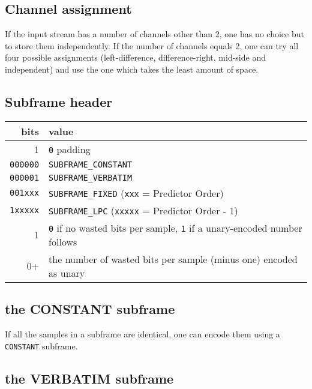 
\subsection{Channel assignment}

If the input stream has a number of channels other than 2,
one has no choice but to store them independently.
If the number of channels equals 2, one can try all four possible
assignments (left-difference, difference-right, mid-side and
independent) and use the one which takes the least amount of space.

\subsection{Subframe header}
\begin{tabular}{|r|l|}
\hline
bits & value \\
\hline
1 & \texttt{0} padding \\
\texttt{000000} & \texttt{SUBFRAME\_CONSTANT} \\
\texttt{000001} & \texttt{SUBFRAME\_VERBATIM} \\
\texttt{001xxx} & \texttt{SUBFRAME\_FIXED} (\texttt{xxx} = Predictor Order) \\
\texttt{1xxxxx} & \texttt{SUBFRAME\_LPC} (\texttt{xxxxx} = Predictor Order - 1) \\
1 & \texttt{0} if no wasted bits per sample, \texttt{1} if a unary-encoded number follows \\
0+ & the number of wasted bits per sample (minus one) encoded as unary \\
\hline
\end{tabular}

\subsection{the CONSTANT subframe}

If all the samples in a subframe are identical, one can encode them
using a \texttt{CONSTANT} subframe.

\subsection{the VERBATIM subframe}

